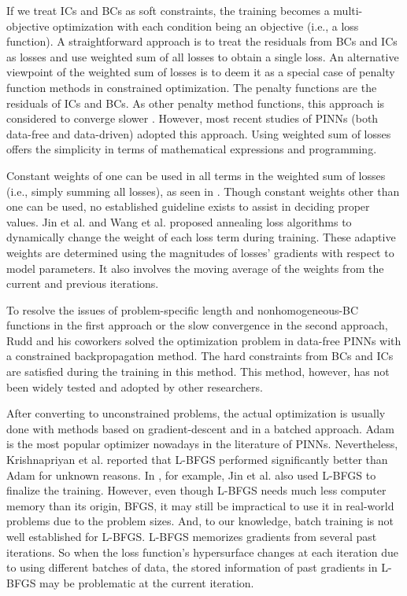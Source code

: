 If we treat ICs and BCs as soft constraints, the training becomes a multi-objective optimization with each condition being an objective (i.e., a loss function).
A straightforward approach is to treat the residuals from BCs and ICs as losses and use weighted sum of all losses to obtain a single loss. 
An alternative viewpoint of the weighted sum of losses is to deem it as a special case of penalty function methods in constrained optimization.
The penalty functions are the residuals of ICs and BCs.
As other penalty method functions, this approach is considered to converge slower \cite{rudd_constrained_2014}.
However, most recent studies of PINNs (both data-free and data-driven) adopted this approach.
Using weighted sum of losses offers the simplicity in terms of mathematical expressions and programming.

Constant weights of one can be used in all terms in the weighted sum of losses (i.e., simply summing all losses), as seen in \cite{lagaris_artificial_1998,sirignano_dgm:_2018,dockhorn_discussion_2019}.
Though constant weights other than one can be used, no established guideline exists to assist in deciding proper values.
Jin et al. \cite{jin_nsfnets_2020} and Wang et al. \cite{wang_understanding_2021} proposed annealing loss algorithms to dynamically change the weight of each loss term during training.
These adaptive weights are determined using the magnitudes of losses' gradients with respect to model parameters.
It also involves the moving average of the weights from the current and previous iterations. 

To resolve the issues of problem-specific length and nonhomogeneous-BC functions in the first approach or the slow convergence in the second approach, Rudd and his coworkers \cite{rudd_constrained_2014,rudd_constrained_2015} solved the optimization problem in data-free PINNs with a constrained backpropagation method.
The hard constraints from BCs and ICs are satisfied during the training in this method.
This method, however, has not been widely tested and adopted by other researchers.

After converting to unconstrained problems, the actual optimization is usually done with methods based on gradient-descent and in a batched approach. 
Adam \cite{kingma_adam_2017} is the most popular optimizer nowadays in the literature of PINNs.
Nevertheless, Krishnapriyan et al. \cite{krishnapriyan_characterizing_2021} reported that L-BFGS performed significantly better than Adam for unknown reasons.
In \cite{jin_nsfnets_2020}, for example, Jin et al. also used L-BFGS to finalize the training.
However, even though L-BFGS needs much less computer memory than its origin, BFGS, it may still be impractical to use it in real-world problems due to the problem sizes.
And, to our knowledge, batch training is not well established for L-BFGS.
L-BFGS memorizes gradients from several past iterations.
So when the loss function's hypersurface changes at each iteration due to using different batches of data, the stored information of past gradients in L-BFGS may be problematic at the current iteration.

